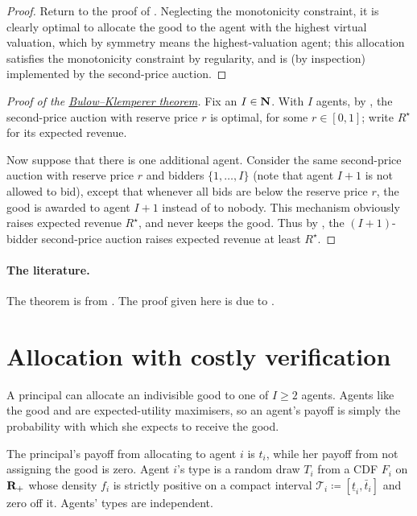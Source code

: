 \begin{proof}
	Return to the proof of .
	Neglecting the monotonicity constraint, it is clearly optimal to allocate the good to the agent with the highest virtual valuation,
	which by symmetry means the highest-valuation agent;
	this allocation satisfies the monotonicity constraint by regularity,
	and is (by inspection) implemented by the second-price auction.
\end{proof}


\begin{proof}[Proof of the {\hyperref[theorem:BulowKlemperer]{Bulow--Klemperer theorem}}]
	Fix an $I \in \mathbf{N}$.
	With $I$ agents, 
	by , 
	the second-price auction with reserve price $r$
	is optimal, for some $r \in [0,1]$;
	write $R^\star$ for its expected revenue.
	
	Now suppose that there is one additional agent.
	Consider the same second-price auction with reserve price $r$ and bidders $\{1,\dots,I\}$ (note that agent $I+1$ is not allowed to bid),
	except that whenever all bids are below the reserve price $r$,
	the good is awarded to agent $I+1$ instead of to nobody.
	This mechanism obviously raises expected revenue $R^\star$, and never keeps the good.
	Thus by , the $(I+1)$-bidder second-price auction raises expected revenue at least $R^\star$.
\end{proof}


\paragraph{The literature.}
The theorem is from \textcite{BulowKlemperer1996}.
The proof given here is due to \textcite{Kirkegaard2006}.



\section{Allocation with costly verification}
\label{sec:ch2:bdl14}

A principal can allocate an indivisible good to one of $I \geq 2$ agents.
Agents like the good and are expected-utility maximisers, so an agent's payoff is simply the probability with which she expects to receive the good.

The principal's payoff from allocating to agent $i$ is $t_i$,
while her payoff from not assigning the good is zero.
Agent $i$'s type is a random draw $T_i$ from a CDF $F_i$ on $\mathbf{R}_+$
whose density $f_i$ is strictly positive on a compact interval $\mathcal{T}_i \coloneqq \left[ \underline{t}_i, \bar{t}_i \right]$ and zero off it.
Agents' types are independent.


